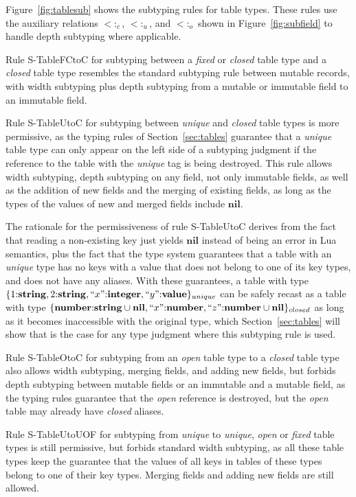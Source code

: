 \documentclass[preprint]{sigplanconf}
\newcommand{\Value}{\mathbf{value}}
\newcommand{\Nil}{\mathbf{nil}}
\newcommand{\Integer}{\mathbf{integer}}
\newcommand{\Number}{\mathbf{number}}
\newcommand{\String}{\mathbf{string}}
\newcommand{\subtype}{<:}
\begin{document}
Figure~\ref{fig:tablesub} shows the subtyping rules for
table types. These rules use the auxiliary relations
$\subtype_{c}$, $\subtype_{u}$, and $\subtype_{o}$
shown in Figure~\ref{fig:subfield} to handle depth
subtyping where applicable.

Rule {\sc S-TableFCtoC} for subtyping
between a {\em fixed} or {\em closed}
table type and a {\em closed} table type resembles the
standard subtyping rule between mutable records, with
width subtyping plus depth subtyping from a mutable
or immutable field to an immutable field.

Rule {\sc S-TableUtoC} for subtyping between {\em unique} and {\em closed} table types is more permissive, as the typing rules of Section~\ref{sec:tables} guarantee that a {\em unique}
table type can only appear on the left side of a subtyping
judgment if the reference to the table with the {\em unique}
tag is being destroyed. This rule allows width subtyping, depth subtyping on any field, not only immutable fields, as well as the addition of new fields and the merging of existing fields, as long as the types of the values of new and merged fields include $\Nil$. 

The rationale for the permissiveness of rule {\sc S-TableUtoC} derives from the fact that reading a non-existing key just yields $\Nil$ instead of being an error in Lua semantics, plus the fact
that the type system guarantees that a table with an
{\em unique} type has no keys with a value that does not
belong to one of its key types, and does not have any
aliases. With these guarantees, a table with type $\{1{:}\String, 2{:}\String,
``x"{:}\Integer, ``y"{:}\Value\}_{unique}$ can be safely recast as a table with type 
$\{\Number{:}\String \cup \Nil, ``x"{:}\Number, ``z"{:}
\Number \cup \Nil\}_{closed}$ as long as it becomes
inaccessible with the original type, which Section~\ref{sec:tables} will show that is the case
for any type judgment where this subtyping rule is used.

Rule {\sc S-TableOtoC} for subtyping from an {\em open} table type to a {\em closed} table type also allows width subtyping, merging fields, and adding new fields, but forbids depth subtyping between mutable fields or an immutable and a mutable field, as the typing rules guarantee that the {\em open} reference
is destroyed, but the {\em open} table may already have {\em closed} aliases.

Rule {\sc S-TableUtoUOF} for subtyping from {\em unique} to {\em unique}, {\em open} or {\em fixed} table types is still permissive, but forbids standard width subtyping, as all these table types keep the guarantee that the values of all keys in tables of these types belong to one of their key types. Merging fields and adding new fields are still allowed.
\end{document}
